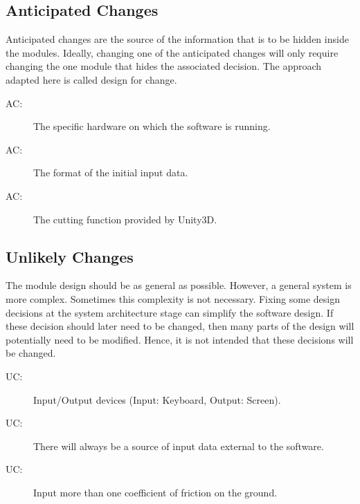 \documentclass[12pt, titlepage]{article}
\newcounter{acnum}
\newcommand{\actheacnum}{AC\theacnum}
\newcounter{ucnum}
\newcommand{\uctheucnum}{UC\theucnum}
\begin{document}
	\subsection{Anticipated Changes} \label{SecAchange}
	
	Anticipated changes are the source of the information that is to be hidden
	inside the modules. Ideally, changing one of the anticipated changes will only
	require changing the one module that hides the associated decision. The approach
	adapted here is called design for
	change.
	
	\begin{description}
		\item[ \actheacnum \label{acHardware}:] The specific
		hardware on which the software is running.
		\item[ \actheacnum \label{acInput}:] The format of the
		initial input data.
		\item[ \actheacnum \label{acCF}:] The
                  cutting function provided by Unity3D.
	\end{description}
	

	\subsection{Unlikely Changes} \label{SecUchange}
	
	The module design should be as general as possible. However, a general system is
	more complex. Sometimes this complexity is not necessary. Fixing some design
	decisions at the system architecture stage can simplify the software design. If
	these decision should later need to be changed, then many parts of the design
	will potentially need to be modified. Hence, it is not intended that these
	decisions will be changed.
	
	\begin{description}
		\item[ \uctheucnum \label{ucIO}:] Input/Output devices
		(Input: Keyboard, Output: Screen).
		\item[ \uctheucnum \label{ucInput}:] There will always be
		a source of input data external to the software.
              \item[ \uctheucnum \label{ucFri}:] Input
                more than one coefficient of friction on the ground.
	\end{description}
\end{document}
